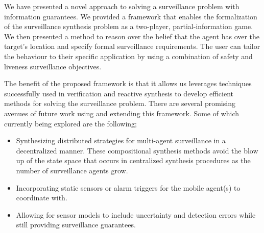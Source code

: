 We have presented a novel approach to solving a surveillance problem with information guarantees. We provided a framework that enables the  formalization of the surveillance synthesis problem as a two-player, partial-information game. We then presented a method to reason over the belief that the agent has over the target's location and specify formal surveillance requirements. The user can tailor the behaviour to their specific application by using a combination of safety and liveness surveillance objectives.

The benefit of the proposed framework is that it allows us leverages techniques successfully used in verification and reactive synthesis to develop efficient methods for solving the surveillance problem. There are several promising  avenues of future work using and extending this framework. Some of which currently being explored are the following;
\begin{itemize}
\item Synthesizing distributed strategies for multi-agent surveillance in a decentralized manner. These compositional synthesis methods avoid the blow up of the state space that occurs in centralized synthesis procedures as the number of surveillance agents grow.
\item Incorporating static sensors or alarm triggers for the mobile agent(s) to coordinate with.
\item Allowing for sensor models to include uncertainty and detection errors while still providing surveillance guarantees.

\end{itemize}
